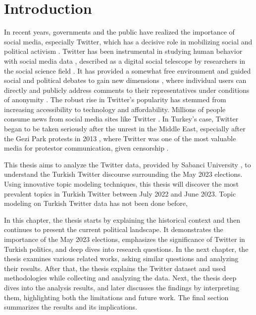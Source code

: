
\chapter{Introduction}\label{chapter:introduction}

In recent years, governments and the public have realized the importance of social media, 
especially Twitter, which has a decisive role in mobilizing social and political activism 
\parencite{uysal_turkeys_twitter_public_diplomacy_2019}. 
Twitter has been instrumental in studying human behavior with social media data 
\parencite{pfeffer_twitter_24_Hours_just_another_day_2023}, 
described as a digital social telescope by researchers in the social science field 
\parencite{mejova_twitter_2015_social_telescope}. 
It has provided a somewhat free environment and guided social and political debates to 
gain new dimensions \parencite{yerlikaya_social_media_manipulation_politics_2020}, 
where individual users can directly and publicly address comments to their representatives under 
conditions of anonymity \parencite{theocharis_twitter_political_incivility_2020}. The robust rise 
in Twitter's popularity has stemmed from increasing accessibility to technology and affordability. 
Millions of people consume news from social media sites like Twitter \parencite{anwar_analyzing_twitter_BERT_QAnon_2021}. 
In Turkey's case, Twitter began to be taken seriously after the unrest in the Middle East, 
especially after the Gezi Park protests in 2013 \parencite{zaharna_uysal_social_media_2016}, 
where Twitter was one of the most valuable media for protestor communication, given censorship 
\parencite{ogan__varol_twitter_gezi_park_2017}.


This thesis aims to analyze the Twitter data, provided by Sabanci University \parencite{secim2023},
to understand the Turkish Twitter discourse surrounding the May 2023 elections. Using innovative
topic modeling techniques, this thesis will discover the most prevalent topics in Turkish Twitter
between July 2022 and June 2023. Topic modeling on Turkish Twitter data has not been done before,

In this chapter, the thesis starts by explaining the historical context and then continues 
to present the current political landscape. It demonstrates the importance of the May 2023 elections, 
emphasizes the significance of Twitter in Turkish politics, and deep dives into research questions. 
In the next chapter, the thesis examines various related works, asking similar questions and 
analyzing their results. After that, the thesis explains the Twitter dataset and used methodologies 
while collecting and analyzing the data. Next, the thesis deep dives into the analysis results, 
and later discusses the findings by interpreting them, highlighting both the limitations and future work. 
The final section summarizes the results and its implications.
